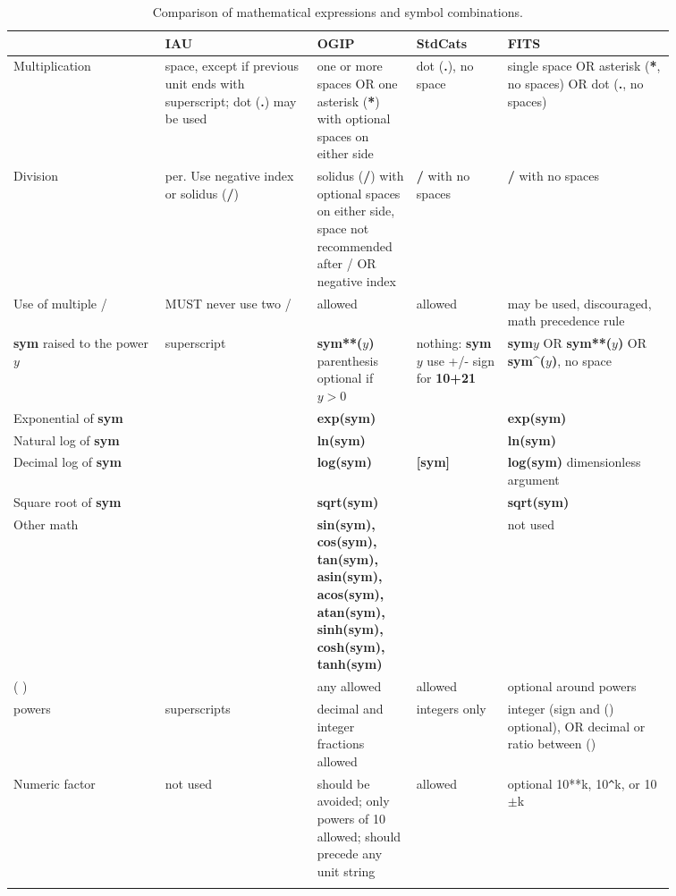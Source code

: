\documentclass[11pt,notitlepage,onecolumn]{ivoa}
\newcommand{\unit}[1]{\textbf{\textsf{\color{orange}#1}}}
\begin{document}
\begin{longtable}[th]{|p{0.2\linewidth}|p{0.2\linewidth}|p{0.12\linewidth}|p{0.12\linewidth}|p{0.22\linewidth}|}
\hline
    & IAU & OGIP  & StdCats & FITS \\\hline
    Multiplication & space, except if previous unit ends with superscript; dot (\unit{.}) may be used\raggedright
    	& one or more spaces OR one asterisk (\unit{*}) with optional spaces on either side\raggedright 
	& dot (\unit{.}), no space 
	& single space OR asterisk (\unit{*}, no spaces) OR dot (\unit{.}, no spaces) \\\hline
    Division & per. Use negative index or solidus (\unit{/})\raggedright
    	& solidus (\unit{/}) with optional spaces on either side, space not recommended after / OR negative index\raggedright
	& \unit{/} with no spaces 
	& \unit{/} with no spaces  \\\hline\hline
    Use of multiple / & MUST never use two /\raggedright 
    	& allowed 
	& allowed 
	& may be used, discouraged, math precedence rule \\\hline\hline
    \unit{sym} raised to the power $y$ & superscript 
    	& \unit{sym**($y$)} parenthesis optional if $y>0$ 
	& nothing: \unit{sym$y$} use +/- sign for \unit{10+21} 
	& \unit{sym$y$} OR \unit{sym**($y$)} OR \unit{sym\^{}($y$)}, no space \\\hline\hline
    Exponential of \unit{sym} &  & \unit{exp(sym)} &  & \unit{exp(sym)} \\\hline\hline
    Natural log of \unit{sym} &  & \unit{ln(sym)} &  & \unit{ln(sym)} \\\hline\hline
    Decimal log of \unit{sym} &  & \unit{log(sym)} & \unit{[sym]} & \unit{log(sym)} dimensionless argument \\\hline\hline
    Square root of \unit{sym} &  & \unit{sqrt(sym)} &  & \unit{sqrt(sym)} \\\hline\hline
    Other math &  & {\small \unit{sin(sym), cos(sym), tan(sym), asin(sym), acos(sym), atan(sym), sinh(sym), cosh(sym), tanh(sym)} } &  & not used \\\hline\hline
    ( ) &  & any allowed & allowed & optional around powers \\\hline\hline
    powers & superscripts & decimal and integer fractions allowed & integers only & integer (sign and () optional), OR decimal or ratio between () \\\hline
    Numeric factor & not used & should be avoided; only powers of 10 allowed; should precede any unit string & allowed & optional 10**k, 10\verb|^|k, or 10$\pm$k \\\hline\hline
  \caption{Comparison of mathematical expressions and symbol combinations.}
  \label{tabx:comparUnitCombine}
\end{longtable}
\end{document}
